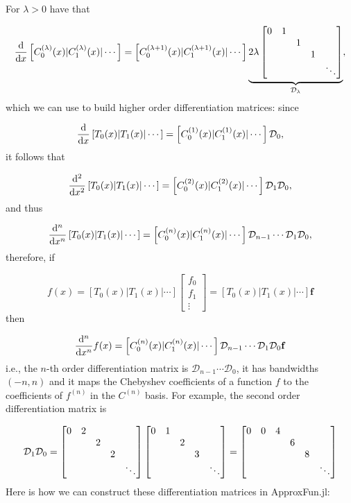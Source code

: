 \documentclass[12pt,landscape]{article}
\begin{document}
{For $\lambda > 0$ have that

\[
{{\rm d} \over {\rm d}x}\left[C_0^{(\lambda)}(x) | C_1^{(\lambda)}(x) | \cdots \right] = \left[C_0^{(\lambda+1)}(x) | C_1^{(\lambda+1)}(x) | \cdots \right]\underbrace{2\lambda\begin{bmatrix}
0 & 1 \cr
&& 1 \cr
&&& 1 \cr
&&&&\ddots
\end{bmatrix}}_{\mathcal{D}_{\lambda}},
\]
which we can use to build higher order differentiation matrices: since

\[
{{\rm d} \over {\rm d}x}\left[T_0(x) | T_1(x) | \cdots \right] = \left[C_0^{(1)}(x) | C_1^{(1)}(x) | \cdots \right]\mathcal{D}_0,
\]
it follows that

\[
{{\rm d}^2 \over {\rm d}x^2}\left[T_0(x) | T_1(x) | \cdots \right] = \left[C_0^{(2)}(x) | C_1^{(2)}(x) | \cdots \right]\mathcal{D}_1\mathcal{D}_0,
\]
and thus

\[
{{\rm d}^n \over {\rm d}x^n}\left[T_0(x) | T_1(x) | \cdots \right] = \left[C_0^{(n)}(x) | C_1^{(n)}(x) | \cdots \right]\mathcal{D}_{n-1}\cdots\mathcal{D}_1\mathcal{D}_0,
\]
therefore, if

\[
f(x) = \left[T_0(x) | T_1(x) | \cdots \right]\begin{bmatrix}
f_0 \\
f_1 \\
\vdots
\end{bmatrix} = \left[T_0(x) | T_1(x) | \cdots \right]\mathbf{f}
\]
then

\[
{{\rm d}^n \over {\rm d}x^n}f(x) = \left[C_0^{(n)}(x) | C_1^{(n)}(x) | \cdots \right]\mathcal{D}_{n-1}\cdots\mathcal{D}_1\mathcal{D}_0\mathbf{f}
\]
i.e., the $n$-th order differentiation matrix is $\mathcal{D}_{n-1}\cdots\mathcal{D}_0$, it has bandwidths $(-n, n)$ and it maps the Chebyshev coefficients of a function $f$ to the coefficients of $f^{(n)}$ in the $C^{(n)}$ basis. For example, the second order differentiation matrix is

\[
\mathcal{D}_1\mathcal{D}_0 = 
\begin{bmatrix}
0 & 2 \cr
&& 2 \cr
&&& 2 \cr
&&&&\ddots
\end{bmatrix}\begin{bmatrix}
0 & 1 \cr
&& 2 \cr
&&& 3 \cr
&&&&\ddots
\end{bmatrix} = \begin{bmatrix}
0 & 0 & 4 \cr
&&& 6 \cr
&&& & 8 \cr
&&&& &\ddots
\end{bmatrix}
\]
Here is how we can construct these differentiation matrices in ApproxFun.jl:


}
\end{document}
